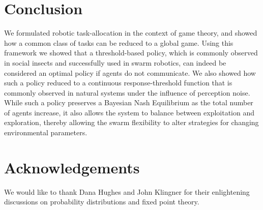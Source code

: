 \documentclass[conference]{ieeeconf}
\begin{document}
\section{Conclusion}\label{sec:conc}
We formulated robotic task-allocation in the context of game theory, and showed how a common class of tasks can be reduced to a global game. Using this framework we showed that a threshold-based policy, which is commonly observed in social insects and successfully used in swarm robotics, can indeed be considered an optimal policy if agents do not communicate. We also showed how such a policy reduced to a continuous response-threshold function that is commonly observed in natural systems under the influence of perception noise. While such a policy preserves a Bayesian Nash Equilibrium as the total number of agents increase, it also allows the system to balance between exploitation and exploration, thereby allowing the swarm flexibility to alter strategies for changing environmental parameters.

\section*{Acknowledgements}
We would like to thank Dana Hughes and John Klingner for their enlightening discussions on probability distributions and fixed point theory.


\end{document}
